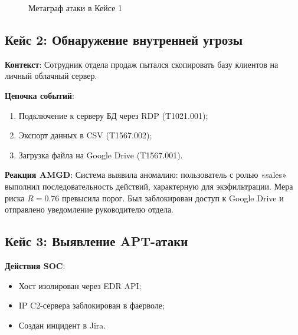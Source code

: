 \documentclass{article}
\begin{document}
\begin{figure}[ht]
\centering
{}
\caption{Метаграф атаки в Кейсе 1}
\label{fig:case1_graph}
\end{figure}

\subsection{Кейс 2: Обнаружение внутренней угрозы}

\textbf{Контекст}:  
Сотрудник отдела продаж пытался скопировать базу клиентов на личный облачный сервер.

\textbf{Цепочка событий}:
\begin{enumerate}
    \item Подключение к серверу БД через RDP (T1021.001);
    \item Экспорт данных в CSV (T1567.002);
    \item Загрузка файла на Google Drive (T1567.001).
\end{enumerate}

\textbf{Реакция AMGD}:  
Система выявила аномалию: пользователь с ролью «sales» выполнил последовательность действий, характерную для экзфильтрации. Мера риска $R = 0.76$ превысила порог. Был заблокирован доступ к Google Drive и отправлено уведомление руководителю отдела.

\subsection{Кейс 3: Выявление APT-атаки}

\textbf{Действия SOC}:  
\begin{itemize}
    \item Хост изолирован через EDR API;
    \item IP C2-сервера заблокирован в фаерволе;
    \item Создан инцидент в Jira.
\end{itemize}
\end{document}
